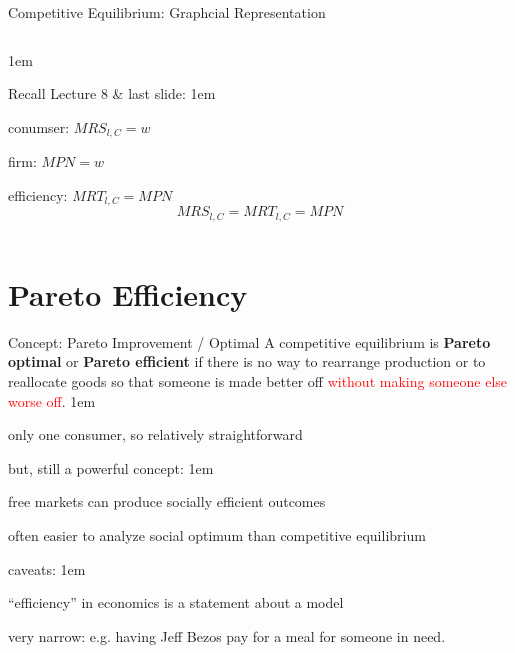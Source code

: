 \documentclass[11pt,aspectratio=43]{beamer}
\newcommand{\red}[1]{\textcolor{red}{#1}}
\let\olditemize=\itemize
\let\endolditemize=\enditemize
\renewenvironment{itemize}{\olditemize \itemsep1em}{\endolditemize}
\theoremstyle{definition}
\begin{document}
\begin{frame}{Competitive Equilibrium: Graphcial Representation}
\begin{columns}
\begin{column}{0.5\textwidth}
\begin{itemize}
                \item Recall Lecture 8 \& last slide:
                \begin{itemize}
                    \item conumser: $ MRS_{l, C} = w $
                    \item firm: $ MPN = w $
                    \item efficiency: $ MRT_{l, C} = MPN $
                \end{itemize}
                \begin{equation*}
                   MRS_{l, C} = MRT_{l, C} = MPN
                \end{equation*}
            \end{itemize}
        \end{column}
    \end{columns}
\end{frame}

\section{Pareto Efficiency}
\label{sec:Pareto_Efficiency}

\begin{frame}{Concept: Pareto Improvement / Optimal}
\label{slide:Concept__Pareto_Improvement___Optimal}
    A competitive equilibrium is \textbf{Pareto optimal} or \textbf{Pareto efficient} if there is no way to \alert{rearrange production or to reallocate goods} so that \alert{someone is made better off} \red{without making someone else worse off}.
    \begin{itemize}
        \item only one consumer, so relatively straightforward
        \item but, still a powerful concept:
        \begin{itemize}
            \item free markets can produce socially efficient outcomes
            \item often easier to analyze social optimum than competitive equilibrium
        \end{itemize}
        \item caveats:
        \begin{itemize}
            \item ``efficiency'' in economics is a statement about a model
            \item very narrow: e.g. having Jeff Bezos pay for a meal for someone in need.
        \end{itemize}
    \end{itemize}
\end{frame}
\end{document}
